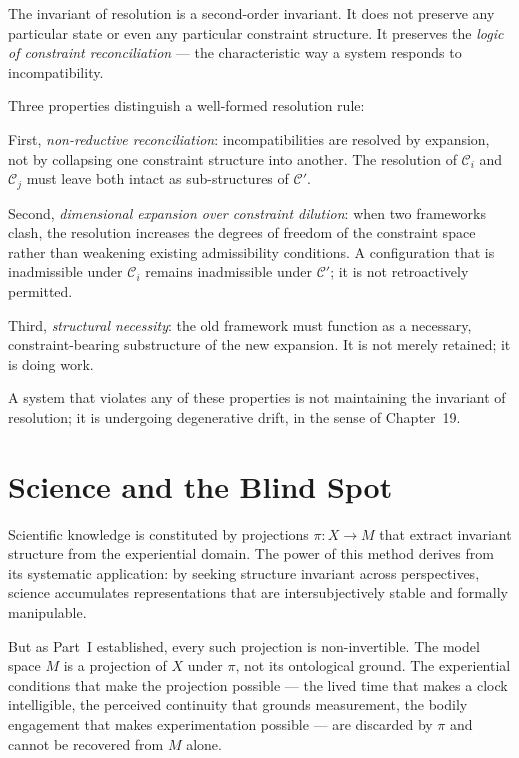 \documentclass[11pt,openany]{book}
\begin{document}
The invariant of resolution is a second-order invariant.
It does not preserve any particular state or even any
particular constraint structure.  It preserves the
\emph{logic of constraint reconciliation} --- the
characteristic way a system responds to incompatibility.

Three properties distinguish a well-formed resolution rule:

First, \emph{non-reductive reconciliation}: incompatibilities
are resolved by expansion, not by collapsing one constraint
structure into another.  The resolution of $\mathcal{C}_i$
and $\mathcal{C}_j$ must leave both intact as sub-structures
of $\mathcal{C}'$.

Second, \emph{dimensional expansion over constraint
dilution}: when two frameworks clash, the resolution
increases the degrees of freedom of the constraint space
rather than weakening existing admissibility conditions.
A configuration that is inadmissible under $\mathcal{C}_i$
remains inadmissible under $\mathcal{C}'$; it is not
retroactively permitted.

Third, \emph{structural necessity}: the old framework must
function as a necessary, constraint-bearing substructure
of the new expansion.  It is not merely retained; it is
doing work.

A system that violates any of these properties is not
maintaining the invariant of resolution; it is undergoing
degenerative drift, in the sense of Chapter~19.

\section{Science and the Blind Spot}
\label{sec:science}

Scientific knowledge is constituted by projections
$\pi : X \to M$ that extract invariant structure from the
experiential domain.  The power of this method derives from
its systematic application: by seeking structure invariant
across perspectives, science accumulates representations
that are intersubjectively stable and formally manipulable.

But as Part~I established, every such projection is
non-invertible.  The model space $M$ is a projection of $X$
under $\pi$, not its ontological ground.  The experiential
conditions that make the projection possible --- the lived
time that makes a clock intelligible, the perceived
continuity that grounds measurement, the bodily engagement
that makes experimentation possible --- are discarded by
$\pi$ and cannot be recovered from $M$ alone.
\end{document}
